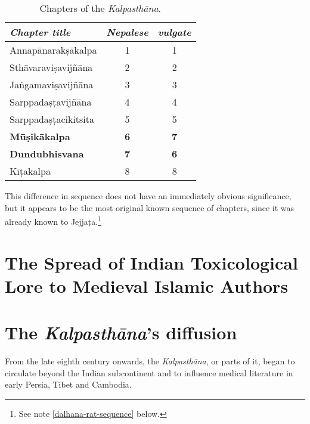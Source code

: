 %
\begin{table}
    \centering\large
\caption{Chapters of the \emph{Kalpasthāna}.}
\medskip    
    \begin{tabular}{lcc}
   
    \emph{Chapter title} & \emph{Nepalese} & \emph{vulgate} \\
    \toprule
    Annapānarakṣākalpa & 1 & 1 \\
    Sthāvaraviṣavijñāna & 2 & 2 \\
    Jaṅgamaviṣavijñāna & 3 & 3 \\
    Sarppadaṣṭavijñāna & 4 & 4 \\
    Sarppadaṣṭacikitsita & 5 & 5 \\
   \midrule
    \textbf{Mūṣikākalpa} & \textbf{6} & \textbf{7} \\
    \textbf{Dundubhisvana} & \textbf{7} & \textbf{6} \\
   \midrule
    Kīṭakalpa & 8 & 8 \\
    \bottomrule
\end{tabular}
\label{kalpa-chapters}
\end{table}
%
%
\noindent
This difference in sequence does not have an immediately obvious 
significance, but it appears to be the most original known sequence of 
chapters, since it was already known to Jejjaṭa.\footnote{See note 
\ref{dalhana-rat-sequence} below.}

\section{The Spread of Indian Toxicological Lore to Medieval Islamic  
Authors}

\section{The \emph{Kalpasthāna}'s diffusion}

From the late eighth century onwards, the \emph{Kalpasthāna}, or parts
of it, began to circulate beyond the Indian subcontinent and to
influence medical literature in early Persia, Tibet and Cambodia.

